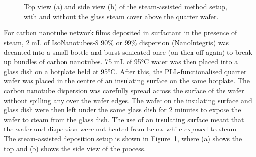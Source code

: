 \documentclass[
  a4paper,
]{scrbook}
\begin{document}
\begin{figure}
\begin{minipage}[t]{0.03\linewidth}
{{}

}

\end{minipage}%
%
\begin{minipage}[t]{0.01\linewidth}

{\centering 

~

}

\end{minipage}%
%
\begin{minipage}[t]{0.45\linewidth}

{\centering 


}

\end{minipage}%
%
\begin{minipage}[t]{0.01\linewidth}

{\centering 

~

}

\end{minipage}%

\caption{\label{fig-steaming-method}Top view (a) and side view (b) of
the steam-assisted method setup, with and without the glass steam cover
above the quarter wafer.}

\end{figure}

For carbon nanotube network films deposited in surfactant in the
presence of steam, 2 mL of IsoNanotubes-S 90\% or 99\% dispersion
(NanoIntegris) was decanted into a small bottle and burst-sonicated once
(on then off again) to break up bundles of carbon nanotubes. 75 mL of
95°C water was then placed into a glass dish on a hotplate held at 95°C.
After this, the PLL-functionalised quarter wafer was placed in the
centre of an insulating surface on the same hotplate. The carbon
nanotube dispersion was carefully spread across the surface of the wafer
without spilling any over the wafer edges. The wafer on the insulating
surface and glass dish were then left under the same glass dish for 2
minutes to expose the wafer to steam from the glass dish. The use of an
insulating surface meant that the wafer and dispersion were not heated
from below while exposed to steam. The steam-assisted deposition setup
is shown in Figure~\ref{fig-steaming-method}, where (a) shows the top
and (b) shows the side view of the process.
\end{document}
